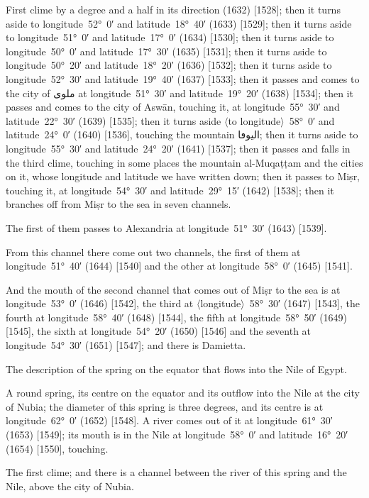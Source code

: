\documentclass[11pt]{article}
\newcommand{\Pg}[1]{\marginpar{\footnotesize #1}}
\newcommand{\Ang}[1]{\ensuremath{#1}}
\begin{document}
First clime by a degree and a half in its direction (1632) [1528]; then it turns aside to longitude~52°~0′ and latitude~18°~40′ (1633) [1529]; then it turns aside to longitude~51°~0′ and latitude~17°~0′ (1634) [1530]; then it turns aside to longitude~50°~0′ and latitude~17°~30′ (1635) [1531]; then it turns aside to longitude~50°~20′ and latitude~18°~20′ (1636) [1532]; then it turns aside to longitude~52°~30′ and latitude~19°~40′ (1637) [1533]; then it passes and comes to the city of \textarabic{ملوى} at longitude~51°~30′ and latitude~19°~20′ (1638) [1534]; then it passes and comes to the city of Aswān, touching it, at longitude~55°~30′ and latitude~22°~30′ (1639) [1535]; then it turns aside \Ang{\langle}to longitude\Ang{\rangle}~58°~0′ and latitude~24°~0′ (1640) [1536], touching the mountain \textarabic{اليوڡا}; then it turns aside to longitude~55°~30′ and latitude~24°~20′ (1641) [1537]; then it passes and falls in the third clime, touching in some places the mountain al-Muqaṭṭam and the cities on it, whose longitude and latitude we have written down; then it passes to Miṣr, touching it, at longitude~54°~30′ and latitude~29°~15′ (1642) [1538]; then it branches off from Miṣr to the sea in seven channels.

The first of them passes to Alexandria at longitude~51°~30′ (1643) [1539].

From this channel there come out two channels, the first of them at longitude~51°~40′ (1644) [1540] and the other at longitude~58°~0′ (1645) [1541]\Pg{p. 109}.

And the mouth of the second channel that comes out of Miṣr to the sea is at longitude~53°~0′ (1646) [1542], the third at \Ang{\langle}longitude\Ang{\rangle}~58°~30′ (1647) [1543], the fourth at longitude~58°~40′ (1648) [1544], the fifth at longitude~58°~50′ (1649) [1545], the sixth at longitude~54°~20′ (1650) [1546] and the seventh at longitude~54°~30′ (1651) [1547]; and there is Damietta.

The description of the spring on the equator that flows into the Nile of Egypt.

A round spring, its centre on the equator and its outflow into the Nile at the city of Nubia; the diameter of this spring is three degrees, and its centre is at longitude~62°~0′ (1652) [1548]. A river comes out of it at longitude~61°~30′ (1653) [1549]; its mouth is in the Nile at longitude~58°~0′ and latitude~16°~20′ (1654) [1550], touching.

The first clime; and there is a channel between the river of this spring and the Nile, above the city of Nubia.
\end{document}
